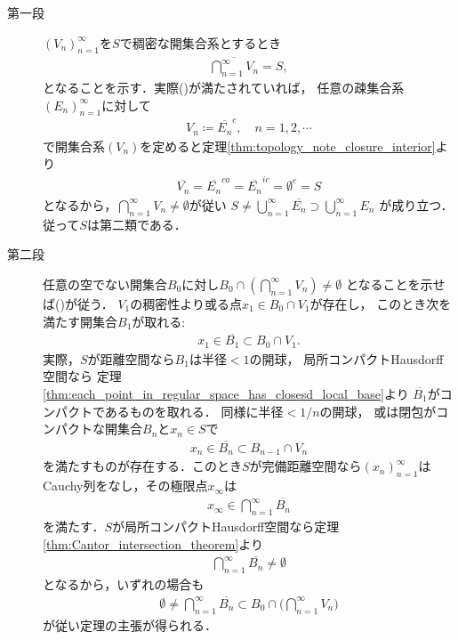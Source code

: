 	\begin{prf}\mbox{}
		\begin{description}
			\item[第一段]
				$(V_n)_{n=1}^\infty$を$S$で稠密な開集合系とするとき
				\begin{align}
					\overline{\bigcap_{n=1}^\infty V_n} = S,
					\label{eq:thm_Baire_category_theorem_1}
				\end{align}
				となることを示す．実際()が満たされていれば，
				任意の疎集合系$(E_n)_{n=1}^\infty$に対して
				\begin{align}
					V_n \coloneqq \overline{E_n}^c,
					\quad n=1,2,\cdots
				\end{align}
				で開集合系$(V_n)$を定めると定理\ref{thm:topology_note_closure_interior}より
				\begin{align}
					\overline{V_n} = \overline{E_n}^{ca} = \overline{E_n}^{ic} = \emptyset^c = S
				\end{align}
				となるから，$\bigcap_{n=1}^\infty V_n \neq \emptyset$が従い
				$S \neq \bigcup_{n=1}^\infty \overline{E_n} \supset \bigcup_{n=1}^\infty E_n$
				が成り立つ．従って$S$は第二類である．
				
			\item[第二段]
				任意の空でない開集合$B_0$に対し$B_0 \cap \left( \bigcap_{n=1}^\infty V_n \right) \neq \emptyset$
				となることを示せば()が従う．
				$V_1$の稠密性より或る点$x_1 \in B_0 \cap V_1$が存在し，
				このとき次を満たす開集合$B_1$が取れる:
				\begin{align}
					x_1 \in \overline{B_1} \subset B_0 \cap V_1.
					\label{eq:thm_Baire_category_theorem_2}
				\end{align}
				実際，$S$が距離空間なら$B_1$は半径$<1$の開球，
				局所コンパクトHausdorff空間なら
				定理\ref{thm:each_point_in_regular_space_has_closesd_local_base}より
				$\overline{B_1}$がコンパクトであるものを取れる．
				同様に半径$<1/n$の開球，
				或は閉包がコンパクトな開集合$B_n$と$x_n \in S$で
				\begin{align}
					x_n \in \overline{B_n} \subset B_{n-1} \cap V_n
				\end{align}
				を満たすものが存在する．このとき$S$が完備距離空間なら$(x_n)_{n=1}^\infty$は
				Cauchy列をなし，その極限点$x_\infty$は
				\begin{align}
					x_\infty \in \bigcap_{n=1}^\infty \overline{B_n}
				\end{align}
				を満たす．$S$が局所コンパクトHausdorff空間なら定理\ref{thm:Cantor_intersection_theorem}より
				\begin{align}
					\bigcap_{n=1}^\infty \overline{B_n} \neq \emptyset
				\end{align}
				となるから，いずれの場合も
				\begin{align}
					\emptyset \neq \bigcap_{n=1}^\infty \overline{B_n} 
					\subset B_0 \cap \Biggl( \bigcap_{n=1}^\infty V_n \Biggr)
				\end{align}
				が従い定理の主張が得られる．
				\QED
		\end{description}
	\end{prf}
	
